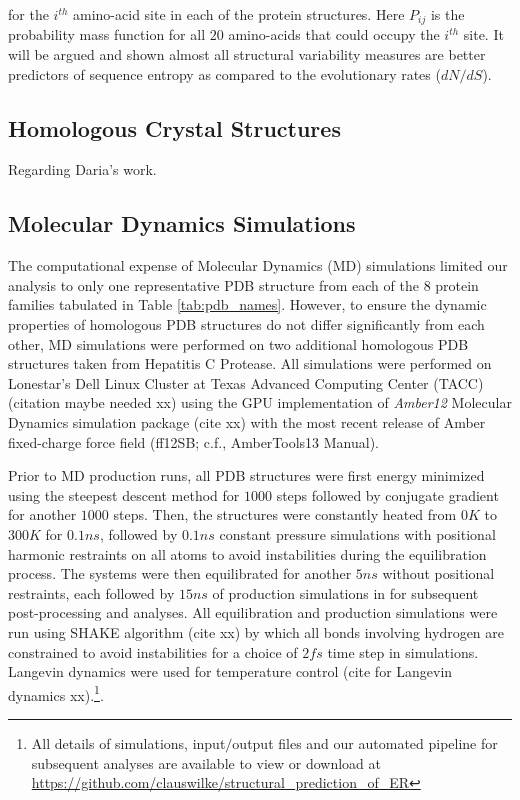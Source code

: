 \documentclass[preprint,12pt]{article}
\begin{document}
        for the $i^{th}$ amino-acid site in each of the protein structures. Here $P_{ij}$ is the probability mass function for all $20$ amino-acids that could occupy the $i^{th}$ site. It will be argued and shown almost all structural variability measures are better predictors of sequence entropy as compared to the evolutionary rates ($dN/dS$).

    \subsection{Homologous Crystal Structures}

        Regarding Daria's work.

    \subsection{Molecular Dynamics Simulations}

        The computational expense of Molecular Dynamics (MD) simulations limited our analysis to only one representative PDB structure from each of the $8$ protein families tabulated in Table \ref{tab:pdb_names}. However, to ensure the dynamic properties of homologous PDB structures do not differ significantly from each other, MD simulations were performed on two additional homologous PDB structures taken from Hepatitis C Protease. All simulations were performed on Lonestar's Dell Linux Cluster at Texas Advanced Computing Center (TACC) (citation maybe needed xx) using the GPU implementation of {\it Amber12} Molecular Dynamics simulation package (cite xx) with the most recent release of Amber fixed-charge force field (ff12SB; c.f., AmberTools13 Manual).
		
        Prior to MD production runs, all PDB structures were first energy minimized using the steepest descent method for $1000$ steps followed by conjugate gradient for another $1000$ steps. Then, the structures were constantly heated from $0K$ to $300K$ for $0.1ns$, followed by $0.1ns$ constant pressure simulations with positional harmonic restraints on all atoms to avoid instabilities during the equilibration process. The systems were then equilibrated for another $5ns$ without positional restraints, each followed by $15ns$ of production simulations in for subsequent post-processing and analyses. All equilibration and production simulations were run using SHAKE algorithm (cite xx) by which all bonds involving hydrogen are constrained to avoid instabilities for a choice of $2fs$ time step in simulations. Langevin dynamics were used for temperature control (cite for Langevin dynamics xx).\footnote{All details of simulations, input$/$output files and our automated pipeline for subsequent analyses are available to view or download at \url{https://github.com/clauswilke/structural\_prediction\_of\_ER}}.
\end{document}
